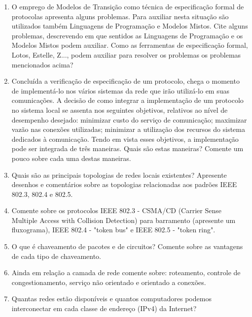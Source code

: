 \documentclass[10pt]{article}
\begin{document}
\begin{enumerate}
\begin{enumerate}
\begin{figure}[h!]
            \label{fig:mef1}
        \end{figure}
    \end{enumerate}
    \item O emprego de Modelos de Transição como técnica de especificação formal de
    protocolas apresenta alguns problemas. Para auxiliar nesta situação são utilizados
    também Linguagens de Programação e Modelos Mistos. Cite alguns problemas, 
    descrevendo em que sentidos as Linguagens de Programação e os Modelos Mistos podem
    auxiliar. Como as ferramentas de especificação formal, Lotos, Estelle, Z..., podem
    auxiliar para resolver os problemas os problemas mencionados acima?

    \item Concluída a verificação de especificação de um protocolo, chega o momento
    de implementá-lo nos vários sistemas da rede que irão utilizá-lo em suas 
    comunicações. A decisão de como integrar a implementação de um protocolo no 
    sistema local se assenta nos seguintes objetivos, relativos ao nível de desempenho
    desejado: minimizar custo do serviço de comunicação; maximizar vazão nas conexões
    utilizadas; minimizar a utilização dos recursos do sistema dedicados à comunicação.
    Tendo em vista esses objetivos, a implementação pode ser integrada de três 
    maneiras. Quais são estas maneiras? Comente um pouco sobre cada uma destas
    maneiras.

    \item Quais são as principais topologias de redes locais existentes? Apresente
    desenhos e comentários sobre as topologias relacionadas aos padrões IEEE 802.3,
    802.4 e 802.5.

    \item Comente sobre os protocolos IEEE 802.3 - CSMA/CD (Carrier Sense Multiple
    Access with Collision Detection) para barramento (apresente um fluxograma),
    IEEE 802.4 - "token bus" e IEEE 802.5 - "token ring".

    \item O que é chaveamento de pacotes e de circuitos? Comente sobre as vantagens
    de cada tipo de chaveamento.

    \item Ainda em relação a camada de rede comente sobre: roteamento, controle de 
    congestionamento, serviço não orientado e orientado a conexões. 

    \item Quantas redes estão disponíveis e quantos computadores podemos interconectar
    em cada classe de endereço (IPv4) da Internet?
\end{enumerate}
\end{document}
